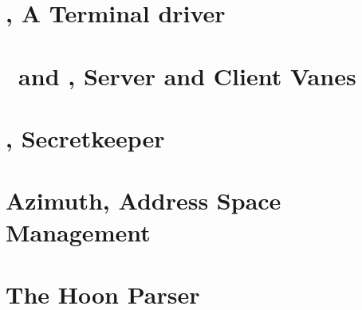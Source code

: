 \section{\dill, A Terminal driver}

\section{\eyre~and \iris, Server and Client Vanes}

\section{\jael, Secretkeeper}

\section{Azimuth, Address Space Management}

\section{The Hoon Parser}
